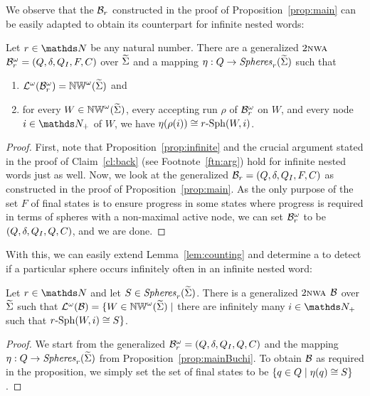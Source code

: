 \documentclass{LMCS}
\begin{document}
We observe that the \tNWA $\mathcal{B}_r$ constructed in the proof of
Proposition~\ref{prop:main} can be easily adapted to obtain its counterpart
for infinite nested words:

\begin{prop}\label{prop:mainBuchi}
  Let $\radius \in \N$ be any natural number. There are a generalized \Buchi
  $2\textsc{nwa}$ $\mathcal{B}_r^\omega=(Q,\delta,Q_I,F,C)$ over $\widetilde{\Sigma}$ and a
  mapping $\eta: Q \rightarrow \mathit{Spheres}_r(\widetilde{\Sigma})$ such that
\begin{enumerate}[$\bullet$]
\item $\mathcal{L}^\omega(\mathcal{B}_r^\omega) = \mathbb{NW}^\omega(\widetilde{\Sigma})$ and
\item for every $W \in \mathbb{NW}^\omega(\widetilde{\Sigma})$, every accepting run $\rho$ of
  $\mathcal{B}_r^\omega$ on $W$, and every node $i \in \posN$ of $W$, we have
  $\eta(\rho(i)) \cong r\text{-}\mathrm{Sph}(W,i)$.
\end{enumerate}
\end{prop}

\begin{proof}
  First, note that Proposition~\ref{prop:infinite} and the crucial argument
  stated in the proof of Claim~\ref{cl:back} (see Footnote~\ref{ftn:arg}) hold
  for infinite nested words just as well. Now, we look at the generalized
  \tNWA $\mathcal{B}_r=(Q,\delta,Q_I,F,C)$ as constructed in the proof of
  Proposition~\ref{prop:main}. As the only purpose of the set $F$ of final
  states is to ensure progress in some states where progress is required in
  terms of spheres with a non-maximal active node, we can set
  $\mathcal{B}_r^\omega$ to be $(Q,\delta,Q_I,Q,C)$, and we are done.
\end{proof}

With this, we can easily extend Lemma~\ref{lem:counting} and determine a
\Buchi \tNWA to detect if a particular sphere occurs infinitely often in an
infinite nested word:

\begin{lem}\label{lem:infcounting}
  Let $\radius \in \N$ and let $S \in \mathit{Spheres}_r(\widetilde{\Sigma})$. There is a
  generalized \Buchi $2\textsc{nwa}$ $\mathcal{B}$ over $\widetilde{\Sigma}$ such that
  $\mathcal{L}^\omega(\mathcal{B}) = \{W \in \mathbb{NW}^\omega(\widetilde{\Sigma}) \mid$ there are infinitely
  many $i \in \infDom$ such that $r\text{-}\mathrm{Sph}(W,i) \cong S\}$.
\end{lem}

\begin{proof}
  We start from the generalized \Buchi \tNWA
  $\mathcal{B}_r^\omega=(Q,\delta,Q_I,Q,C)$ and the mapping $\eta: Q
  \rightarrow \mathit{Spheres}_r(\widetilde{\Sigma})$ from
  Proposition~\ref{prop:mainBuchi}. To obtain $\mathcal{B}$ as required in the
  proposition, we simply set the set of final states to be $\{q \in Q \mid
  \eta(q) \cong S\}$.
\end{proof}
\end{document}
